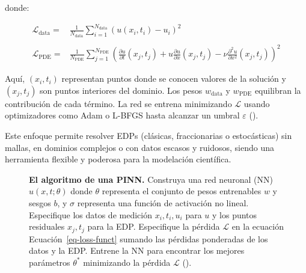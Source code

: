 \documentclass[
  spanish,
  us-letterpaper,
  DIV=11,
  numbers=noendperiod]{scrreprt}
\theoremstyle{definition}
\theoremstyle{plain}
\theoremstyle{remark}
\begin{document}
donde:

\begin{align*}
\mathcal{L}_{\text{data}} =& \frac{1}{N_{\text{data}}} \sum_{i=1}^{N_{\text{data}}} \left( u(x_i, t_i) - u_i \right)^2 \\ \\
\mathcal{L}_{\text{PDE}} =& \frac{1}{N_{\text{PDE}}} \sum_{j=1}^{N_{\text{PDE}}} \left( \frac{\partial u}{\partial t}(x_j, t_j) + u \frac{\partial u}{\partial x}(x_j, t_j) - \nu \frac{\partial^2 u}{\partial x^2}(x_j, t_j) \right)^2
\end{align*}

Aquí, \((x_i, t_i)\) representan puntos donde se conocen valores de la
solución y \((x_j, t_j)\) son puntos interiores del dominio. Los pesos
\(w_{\text{data}}\) y \(w_{\text{PDE}}\) equilibran la contribución de
cada término. La red se entrena minimizando \(\mathcal{L}\) usando
optimizadores como Adam o L-BFGS hasta alcanzar un umbral
\(\varepsilon\) ().

Este enfoque permite resolver EDPs (clásicas, fraccionarias o
estocásticas) sin mallas, en dominios complejos o con datos escasos y
ruidosos, siendo una herramienta flexible y poderosa para la modelación
científica.

\begin{figure}


\caption{\label{fig-pinn_graph}\textbf{El algoritmo de una PINN.}
Construya una red neuronal (NN) \(u(x, t; \theta)\) donde \(\theta\)
representa el conjunto de pesos entrenables \(w\) y sesgos \(b\), y
\(\sigma\) representa una función de activación no lineal. Especifique
los datos de medición \({x_i, t_i, u_i}\) para \(u\) y los puntos
residuales \({x_j, t_j}\) para la EDP. Especifique la pérdida
\(\mathcal{L}\) en la ecuación Ecuación~\ref{eq-loss-funct} sumando las
pérdidas ponderadas de los datos y la EDP. Entrene la NN para encontrar
los mejores parámetros \(\mathbb{\theta^*}\) minimizando la pérdida
\(\mathcal{L}\) ().}

\end{figure}%
\end{document}
